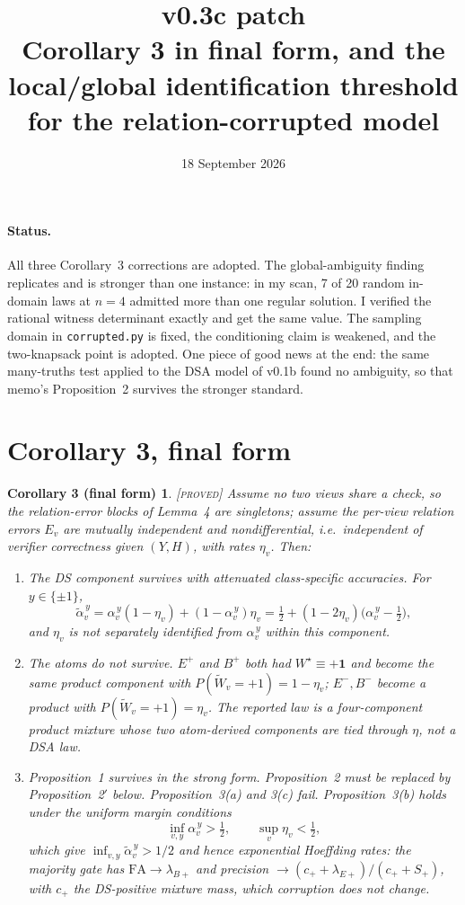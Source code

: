 \documentclass[11pt]{article}
\title{\textbf{v0.3c patch}\\[2pt]
\large Corollary 3 in final form, and the local/global identification threshold\\ for the relation-corrupted model}
\author{18 September 2026}
\date{}
\newtheorem*{corthree}{Corollary 3 (final form)}
\theoremstyle{remark}
\newcommand{\status}[1]{\hfill{\normalfont\small\textsc{[#1]}}}
\newcommand{\Wt}{\widetilde{W}}
\newcommand{\one}{\mathbf{1}}
\begin{document}
\maketitle
\vspace{-2.5em}

\paragraph{Status.} All three Corollary~3 corrections are adopted. The global-ambiguity finding replicates and is stronger than one instance: in my scan, 7 of 20 random in-domain laws at $n=4$ admitted more than one regular solution. I verified the rational witness determinant exactly and get the same value. The sampling domain in \texttt{corrupted.py} is fixed, the conditioning claim is weakened, and the two-knapsack point is adopted. One piece of good news at the end: the same many-truths test applied to the DSA model of v0.1b found no ambiguity, so that memo's Proposition~2 survives the stronger standard.

\section*{Corollary 3, final form}

\begin{corthree}\status{proved}
Assume no two views share a check, so the relation-error blocks of Lemma~4 are singletons; assume the per-view relation errors $E_v$ are mutually independent and nondifferential, i.e.\ independent of verifier correctness given $(Y,H)$, with rates $\eta_v$. Then:
\begin{enumerate}
\item[(a)] \emph{The DS component survives with attenuated class-specific accuracies.} For $y\in\{\pm1\}$,
\[
\tilde\alpha_v^{\,y}=\alpha_v^{\,y}(1-\eta_v)+(1-\alpha_v^{\,y})\eta_v=\tfrac12+(1-2\eta_v)\bigl(\alpha_v^{\,y}-\tfrac12\bigr),
\]
and $\eta_v$ is not separately identified from $\alpha_v^{\,y}$ within this component.
\item[(b)] \emph{The atoms do not survive.} $E^+$ and $B^+$ both had $W^\star\equiv+\one$ and become the same product component with $P(\Wt_v=+1)=1-\eta_v$; $E^-,B^-$ become a product with $P(\Wt_v=+1)=\eta_v$. The reported law is a four-component product mixture whose two atom-derived components are tied through $\eta$, not a DSA law.
\item[(c)] Proposition~1 survives in the strong form. Proposition~2 must be replaced by Proposition~2$'$ below. Proposition~3(a) and 3(c) fail. Proposition~3(b) holds under the uniform margin conditions
\[
\inf_{v,y}\alpha_v^{\,y}>\tfrac12,\qquad \sup_v\eta_v<\tfrac12,
\]
which give $\inf_{v,y}\tilde\alpha_v^{\,y}>1/2$ and hence exponential Hoeffding rates: the majority gate has $\mathrm{FA}\to\lambda_{B+}$ and precision $\to(c_++\lambda_{E+})/(c_++S_+)$, with $c_+$ the DS-positive \emph{mixture mass}, which corruption does not change.
\end{enumerate}
\end{corthree}
\end{document}
